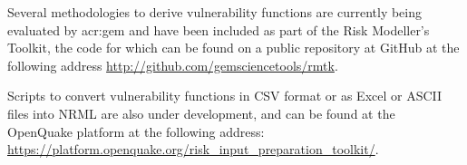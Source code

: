Several methodologies to derive \glspl{vulnerability function} are currently being
evaluated by \gls{acr:gem} and have been included as part of the Risk
Modeller's Toolkit, the code for which can be found on a public repository at
GitHub at the following address
\href{http://github.com/gemsciencetools/rmtk}{http://github.com/gemsciencetools/rmtk}.

Scripts to convert \glspl{vulnerability function} in CSV format or as Excel or
ASCII files into NRML are also under development, and can be found at the
OpenQuake platform at the following address:
\href{https://platform.openquake.org/risk_input_preparation_toolkit/}{https://platform.openquake.org/risk\_input\_preparation\_toolkit/}.
